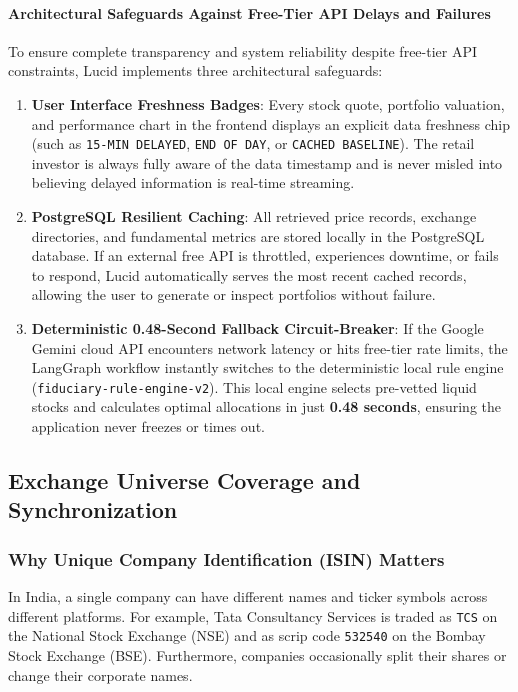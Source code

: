 \paragraph{Architectural Safeguards Against Free-Tier API Delays and Failures}
To ensure complete transparency and system reliability despite free-tier API constraints, Lucid implements three architectural safeguards:
\begin{enumerate}
    \item \textbf{User Interface Freshness Badges}: Every stock quote, portfolio valuation, and performance chart in the frontend displays an explicit data freshness chip (such as \texttt{15-MIN DELAYED}, \texttt{END OF DAY}, or \texttt{CACHED BASELINE}). The retail investor is always fully aware of the data timestamp and is never misled into believing delayed information is real-time streaming.
    \item \textbf{PostgreSQL Resilient Caching}: All retrieved price records, exchange directories, and fundamental metrics are stored locally in the PostgreSQL database. If an external free API is throttled, experiences downtime, or fails to respond, Lucid automatically serves the most recent cached records, allowing the user to generate or inspect portfolios without failure.
    \item \textbf{Deterministic 0.48-Second Fallback Circuit-Breaker}: If the Google Gemini cloud API encounters network latency or hits free-tier rate limits, the LangGraph workflow instantly switches to the deterministic local rule engine (\texttt{fiduciary-rule-engine-v2}). This local engine selects pre-vetted liquid stocks and calculates optimal allocations in just \textbf{0.48 seconds}, ensuring the application never freezes or times out.
\end{enumerate}

\subsection{Exchange Universe Coverage and Synchronization}

\subsubsection{Why Unique Company Identification (ISIN) Matters}
In India, a single company can have different names and ticker symbols across different platforms. For example, Tata Consultancy Services is traded as \texttt{TCS} on the National Stock Exchange (NSE) and as scrip code \texttt{532540} on the Bombay Stock Exchange (BSE). Furthermore, companies occasionally split their shares or change their corporate names.

